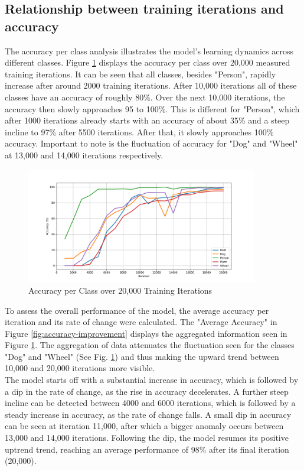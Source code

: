 \subsection{Relationship between training iterations and accuracy}
The accuracy per class analysis illustrates the model's learning dynamics across different classes.
Figure \ref{fig:accuracy-vs-training-iterations} displays the accuracy per class over 20,000 measured training iterations.
It can be seen that all classes, besides "Person", rapidly increase after around 2000 training iterations. After 10,000 iterations
all of these classes have an accuracy of roughly 80\%. Over the next 10,000 iterations, the accuracy then slowly approaches 95 to 100\%.
This is different for "Person", which after 1000 iterations already starts with an accuracy of about 35\% and a steep incline to 97\%
after 5500 iterations. After that, it slowly approaches 100\% accuracy.
Important to note is the fluctuation of accuracy for "Dog" and "Wheel" at 13,000 and 14,000 iterations respectively.

\begin{figure}[h]
   \centering
   \includegraphics[width=0.9\textwidth]{../Data/accuracy-graph.png}
   \caption{Accuracy per Class over 20,000 Training Iterations}
   \label{fig:accuracy-vs-training-iterations}
\end{figure}

To assess the overall performance of the model, the average accuracy per iteration and its rate of change were calculated.
The "Average Accuracy" in Figure \ref{fig:accuracy-improvement} displays the aggregated information seen in Figure 
\ref{fig:accuracy-vs-training-iterations}. The aggregation of data attenuates the fluctuation seen for the classes "Dog" and "Wheel" 
(See Fig. \ref{fig:accuracy-vs-training-iterations}) and thus making the upward trend between 10,000 and 20,000 iterations more visible.
\\
The model starts off with a substantial increase in accuracy, which is followed by a dip in the rate of change, as the rise in accuracy 
decelerates. A further steep incline can be detected between 4000 and 6000 iterations, which is followed by a steady increase in accuracy, as
the rate of change falls. A small dip in accuracy can be seen at iteration 11,000, after which a bigger anomaly occurs between 13,000
and 14,000 iterations. Following the dip, the model resumes its positive uptrend trend, reaching an average performance of 98\% after its final
iteration (20,000).

